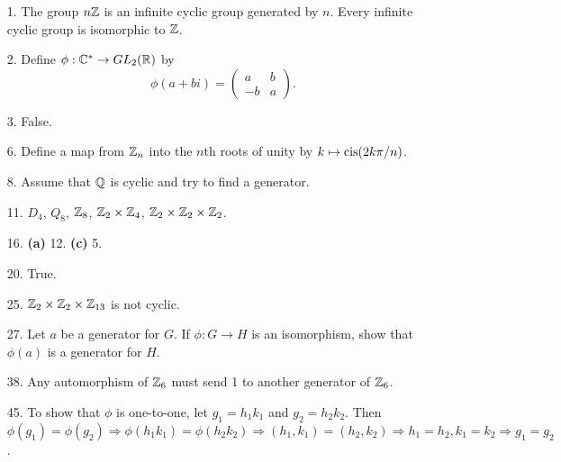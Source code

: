 {\small
\begin{itemize}
 
\bf\item[1.]\rm 
The group $n{\Bbb Z}$ is an infinite cyclic group generated by $n$.
Every infinite cyclic group is isomorphic to ${\Bbb Z}$.
 
 
\bf\item[2.]\rm 
Define $\phi: {\Bbb C}^* \rightarrow GL_2( {\Bbb R})$ by 
\[
\phi(a + bi) = 
\left(
\begin{array}{cc}
a & b \\
-b & a
\end{array}
\right).
\]
 
 
\bf\item[3.]\rm
False.
 
\bf\item[6.]\rm
Define a map from ${\Bbb Z}_n$ into the $n$th roots of unity by $k
\mapsto \operatorname{cis}(2k\pi / n)$.
 
\bf\item[8.]\rm
Assume that ${\Bbb Q}$ is cyclic and try to find a generator.
 
 
\bf\item[11.]\rm
$D_4$, $Q_8$, ${\Bbb Z}_8$, ${\Bbb Z}_2 \times {\Bbb Z}_4$,
${\Bbb Z}_2 \times {\Bbb Z}_2 \times {\Bbb Z}_2$.
 
\bf\item[16.]\rm
{\bf (a)} 12.
{\bf (c)} 5.
 
 
\bf\item[20.]\rm
True.
 
 
\bf\item[25.]\rm
${\Bbb Z}_2 \times {\Bbb Z}_2 \times {\Bbb Z}_{13}$ is not cyclic. 
 
\bf\item[27.]\rm
Let $a$ be a generator for $G$. If $\phi :G \rightarrow H$ is an
isomorphism, show that $\phi(a)$ is a generator for $H$.
 
\bf\item[38.]\rm
Any automorphism of ${\Bbb Z}_6$ must send 1 to another generator of
${\Bbb Z}_6$.
 
 
\bf\item[45.]\rm
To show that $\phi$ is one-to-one, let $g_1 = h_1 k_1$ and $g_2 = h_2
k_2$. Then $\phi(g_1) = \phi(g_2) \Rightarrow \phi(h_1 k_1) = \phi(h_2
k_2) \Rightarrow (h_1, k_1) = (h_2, k_2) \Rightarrow h_1 = h_2, k_1 =
k_2 \Rightarrow g_1 = g_2$. 
 
 
 
 
\end{itemize}
}
 
